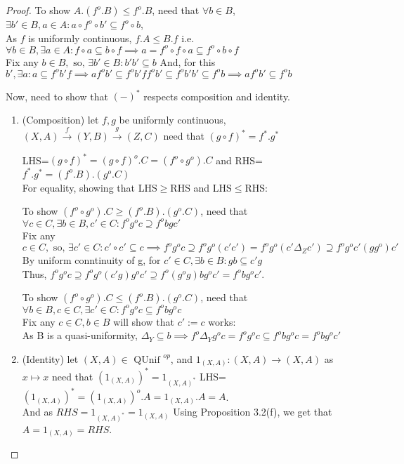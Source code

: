 \documentclass[18pt,a4paper]{article}
\theoremstyle{definition}
\begin{document}
\begin{proof}
		To show $A.(f^o .B) \leq f^o .B$, need that $\forall b \in B$,
		$\exists b' \in B, a\in A : a \circ f^o \circ b' \subseteq f^o \circ b$,\\
		As $f$ is uniformly continuous, $f.A\leq B.f$ i.e. $\forall b \in B, \exists a \in A
		: f \circ a \subseteq b \circ f
		\implies a= f^o \circ f \circ a \subseteq f^o \circ  b \circ f $   \\
		Fix any $b \in B, \text{ so, } \exists b' \in B : b'b' \subseteq b$
		And, for this $b', \exists a : a \subseteq f^ob'f \implies af^ob' \subseteq f^ob'ff^ob'
		\subseteq f^o b'b' \subseteq f^o b \implies af^ob' \subseteq f^o b$\\
	\item	Now, need to show that $(-)^*$ respects composition and identity.
		\begin{enumerate}[label=(\roman*)]
			\item (Composition) let $f,g$ be uniformly continuous,
				$(X,A) \xrightarrow{f} (Y,B) \xrightarrow{g} (Z,C)$
				need that $(g \circ f)^*= f^*.g^* $

				LHS=$(g \circ f)^*=(g \circ f)^o .C=(f^o \circ g^o).C$ and
				RHS=$f^*.g^* =(f^o .B).(g^o .C)$\\
				For equality, showing that LHS$\geq$RHS and LHS$\leq$RHS:

				To show $(f^o \circ g^o).C\geq(f^o .B).(g^o .C)$, need that
				$\forall c \in C, \exists b \in B, c' \in C : f^og^oc
				\supseteq f^obgc'$ \\
				Fix any $c \in C, \text{ so, } \exists c' \in C: c' \circ c' \subseteq c
				\implies f^o g^o c \supseteq f^o g^o (c'c')
				=f^o g^o (c' \Delta_Z c') \supseteq f^o g^o c'(gg^o)c'$ \\
				By uniform conntinuity of g, for $c'\in C,\exists b\in B: gb\subseteq c'g $
				\\Thus, $f^o g^o c \supseteq f^o g^o (c'g)g^oc' \supseteq
				f^o (g^o g)bg^o c'=f^o bg^o c'$.

				To show $(f^o \circ g^o).C\leq(f^o .B).(g^o .C)$, need that
				$\forall b \in B, c \in C, \exists c' \in C: f^o g^o c \subseteq f^obg^oc $
				\\Fix any $c\in C, b\in B$ will show that $c':=c$ works:\\
				As B is a quasi-uniformity, $\Delta_Y \subseteq b\implies f^o \Delta_Y
				g^o c=f^o g^o c \subseteq f^o b	g^o c=f^o b g^o c'$
			\item(Identity) let $(X,A)\in \text{ QUnif }^{op} $, and
				$1_{(X,A)}:(X,A)\to(X,A)$ as $x\mapsto x$ need that
				$(1_{(X,A)})^*=1_{(X,A)^*}$
				LHS=$(1_{(X,A)})^*=(1_{(X,A)})^o.A=1_{(X,A)}.A=A$. \\
				And as $RHS=1_{(X,A)^*}=1_{(X,A)}$
				Using Proposition 3.2(f), we get that $A=1_{(X,A)}=RHS$.
		\end{enumerate}



	\end{proof}
\end{document}
